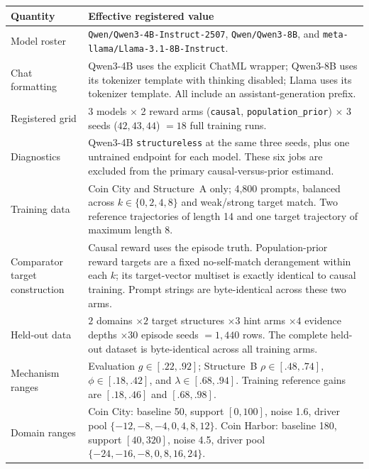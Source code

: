 \begin{center}
\begin{minipage}{\linewidth}
\centering
{}
\label{tab:exp3-coin-structural-hparams}
\scriptsize
\setlength{\tabcolsep}{3pt}
\begin{tabular}{p{.29\linewidth}p{.66\linewidth}}
\toprule
\textbf{Quantity} & \textbf{Effective registered value} \\
\midrule
Model roster & \texttt{Qwen/Qwen3-4B-Instruct-2507},
\texttt{Qwen/Qwen3-8B}, and
\texttt{meta-llama/Llama-3.1-8B-Instruct}. \\
Chat formatting & Qwen3-4B uses the explicit ChatML wrapper; Qwen3-8B uses its
tokenizer template with thinking disabled; Llama uses its tokenizer template.
All include an assistant-generation prefix. \\
Registered grid & 3 models $\times$ 2 reward arms
(\texttt{causal}, \texttt{population\_prior}) $\times$ 3 seeds
($42,43,44$) $=18$ full training runs. \\
Diagnostics & Qwen3-4B \texttt{structureless} at the same three seeds, plus one
untrained endpoint for each model. These six jobs are excluded from the primary
causal-versus-prior estimand. \\
Training data & Coin City and Structure~A only; 4,800 prompts, balanced across
$k\in\{0,2,4,8\}$ and weak/strong target match. Two reference trajectories of
length 14 and one target trajectory of maximum length 8. \\
Comparator target construction & Causal reward uses the episode truth.
Population-prior reward targets are a fixed no-self-match derangement within
each $k$; its target-vector multiset is exactly identical to causal training.
Prompt strings are byte-identical across these two arms. \\
Held-out data & $2$ domains $\times2$ target structures $\times3$ hint arms
$\times4$ evidence depths $\times30$ episode seeds $=1,440$ rows. The complete
held-out dataset is byte-identical across all training arms. \\
Mechanism ranges & Evaluation $g\in[.22,.92]$; Structure~B
$\rho\in[.48,.74]$, $\phi\in[.18,.42]$, and $\lambda\in[.68,.94]$.
Training reference gains are $[.18,.46]$ and $[.68,.98]$. \\
Domain ranges & Coin City: baseline 50, support $[0,100]$, noise 1.6, driver
pool $\{-12,-8,-4,0,4,8,12\}$. Coin Harbor: baseline 180, support $[40,320]$,
noise 4.5, driver pool $\{-24,-16,-8,0,8,16,24\}$. \\

\end{tabular}
\end{minipage}
\end{center}

